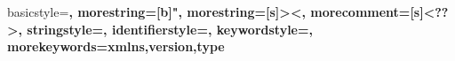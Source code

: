 \newcommand{\etal}{\emph{et al}}
\newcommand{\oflops}{OFLOPS\xspace}
\newcommand{\sdnsim}{SDNSIM\xspace}
\newcommand{\of}{OpenFlow\xspace}
\def\etal{{\it et al.}}

\usepackage{color}
\makeatletter \newcommand {}
  \newcommand\l@todo[2]
      {\par\noindent \textit{#2}, \parbox{10cm}{#1}\par} \makeatother

\newcommand{\todo}[1]{
    \addcontentsline{tdo}{todo}{\protect{#1}}
  \emph{\color{red}{#1}}
    }

\newcommand{\signpost}{Signpost}
\newcommand{\dnssec}{DNSSEC}
\newcommand{\unik}{unikernel}
\newcommand{\Unik}{Unikernel}
\newcommand{\mirage}{Mirage}
\newcommand{\Mirage}{Mirage}
\newcommand{\mirageurl}{\emph{http://openmirage.org}}

\usepackage{listings,color}
 
 
 
{
  basicstyle=\ttfamily\color{darkblue}\bfseries,
  morestring=[b]",
  morestring=[s]{>}{<},
  morecomment=[s]{<?}{?>},
  stringstyle=\color{black},
  identifierstyle=\color{darkblue},
  keywordstyle=\color{cyan},
  morekeywords={xmlns,version,type}%
}
